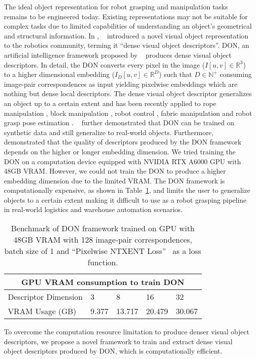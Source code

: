 The ideal object representation for robot grasping and manipulation tasks remains to be engineered today.
Existing representations may not be suitable for complex tasks due to limited capabilities of understanding an object's geometrical and structural information.
In \citeyear{florence2018dense}, \citeauthor{florence2018dense}~\cite{florence2018dense} introduced a novel visual
object representation to the robotics community,  terming it ``dense visual object descriptors''. DON, an artificial intelligence
framework proposed by
~\cite{florence2018dense} produces dense visual object descriptors. In detail, the DON converts every pixel in the
image ($I[u, v] \in \mathbb{R}^3$) to a higher dimensional embedding ($I_D[u, v] \in \mathbb{R}^D$) such that $D \in \mathbb{N}^+$ consuming
image-pair correspondences as input yielding pixelwise embeddings
which are nothing but dense local descriptors.
The dense visual object descriptor generalizes an object up to a certain extent and has been recently
applied to rope manipulation \cite{rope-manipulation},
block manipulation \cite{block-manipulation}, robot control \cite{florence2019self}, fabric manipulation \cite{fabric-manipulation} and
robot grasp pose estimation \parencites{kupcsik2021supervised}{adrian2022efficient}. \citeauthor{adrian2022efficient}~\cite{adrian2022efficient}
further demonstrated that DON can be trained on synthetic data and still generalize to real-world objects. Furthermore, \citeauthor{adrian2022efficient}~\cite{adrian2022efficient} demonstrated that
the quality of descriptors produced by the DON framework depends on the higher or longer embedding dimension. We tried training the DON on a computation
device equipped with NVIDIA RTX A6000 GPU with 48GB VRAM. However, we could not train the DON to produce a higher embedding dimension due to the limited VRAM.
The DON framework is computationally expensive, as shown in Table~\ref{table:don_gpu_bechmark}, and limits the user to generalize objects to a certain extent making it
difficult to use as a robot grasping pipeline in real-world logistics and warehouse automation scenarios.

\begin{table}[htb]
    \caption{Benchmark of DON framework trained on GPU with 48GB VRAM with 128 image-pair correspondences, batch size of 1 and ``Pixelwise NTXENT Loss''~\cite{adrian2022efficient} as a loss function.}
    \label{table:don_gpu_bechmark}
    \centering
    \begin{tabular}{lllll}
        \toprule
        \multicolumn{5}{c}{GPU VRAM consumption to train DON}   \\
        \midrule
        Descriptor Dimension & 3     & 8      & 16     & 32     \\
        VRAM Usage (GB)      & 9.377 & 13.717 & 20.479 & 30.067 \\
        \bottomrule
    \end{tabular}
\end{table}

To overcome the computation resource limitation to produce denser visual object descriptors, we propose a novel framework to
train and extract dense visual object descriptors produced by DON, which is computationally efficient.